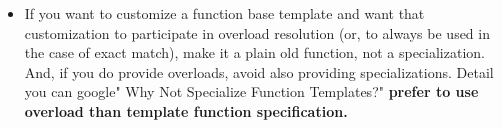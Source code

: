 \documentclass[a4paper,11pt,twoside]{book}
\newcommand{\Hilight}[1]{\makebox[0pt][l]{\color{yellow}\rule[-3pt]{#1em}{11pt}}}
\newcommand{\Hilight}[1]{}
\begin{document}
\begin{itemize}
\begin{lstlisting}[frame=single, language=c++]
template void func<int>(int param); // explicit instantiation.

template $\Hilight{2}$<> void func<int>(int param) {} // specialization
\end{lstlisting}

	\item  If you want to customize a function base template and want that customization to participate in overload resolution (or, to always be used in the case of exact match), make it a plain old function, not a specialization. And, if you do provide overloads, avoid also providing specializations. Detail you can google" Why Not Specialize Function Templates?" \textbf{prefer to use overload than template function specification.}

\end{itemize}
\end{document}
